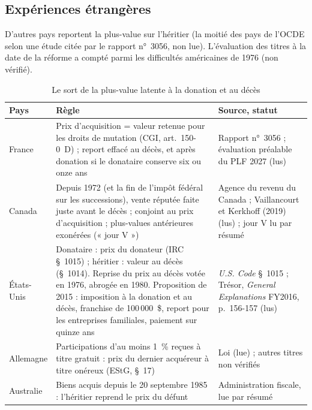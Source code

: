 
\subsection{Expériences étrangères}

D'autres pays reportent la plus-value sur l'héritier (la moitié des pays de l'OCDE selon une étude citée par le
rapport n°~3056, non lue). L'évaluation des titres à la date de la réforme a compté parmi les difficultés américaines
de 1976 (non vérifié).

\begin{table}[!htbp]\centering\scriptsize
\caption{Le sort de la plus-value latente à la donation et au décès}\label{tab:pfu_a_etranger}
\begin{tabularx}{\linewidth}{@{}>{\raggedright\arraybackslash}p{1.8cm}>{\raggedright\arraybackslash}X>{\raggedright\arraybackslash}p{4.2cm}@{}}
\toprule
Pays & Règle & Source, statut \\
\midrule
France & Prix d'acquisition = valeur retenue pour les droits de mutation (CGI, art.~150-0~D) ; report effacé au
décès, et après donation si le donataire conserve six ou onze ans & Rapport n°~3056 ; évaluation préalable du PLF
2027 (lus) \\
Canada & Depuis 1972 (et la fin de l'impôt fédéral sur les successions), vente réputée faite juste avant le décès ;
conjoint au prix d'acquisition ; plus-values antérieures exonérées (« jour V ») & Agence du revenu du Canada ;
Vaillancourt et Kerkhoff (2019) (lus) ; jour V lu par résumé \\
États-Unis & Donataire : prix du donateur (IRC §~1015) ; héritier : valeur au décès (§~1014). Reprise du prix au décès
votée en 1976, abrogée en 1980. Proposition de 2015 : imposition à la donation et au décès, franchise de
100\,000~\$, report pour les entreprises familiales, paiement sur quinze ans &
\emph{U.S. Code} §~1015 ; Trésor, \emph{General Explanations} FY2016, p.~156-157 (lus) \\
Allemagne & Participations d'au moins 1~\% reçues à titre gratuit : prix du dernier acquéreur à titre onéreux (EStG,
§~17) & Loi (lue) ; autres titres non vérifiés \\
Australie & Biens acquis depuis le 20 septembre 1985 : l'héritier reprend le prix du défunt & Administration fiscale,
lue par résumé \\
\bottomrule
\end{tabularx}
\end{table}


